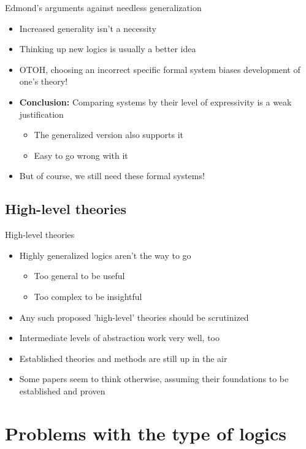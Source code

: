 \documentclass[10pt,a4paper]{beamer}
\begin{document}
\begin{frame}{Edmond's arguments against needless generalization}
\begin{itemize}
\item Increased generality isn't a necessity
\item Thinking up new logics is usually a better idea
\item OTOH, choosing an incorrect specific formal system biases development of one's theory!
\item \textbf{Conclusion:} Comparing systems by their level of expressivity is a weak justification
\begin{itemize}
\item The generalized version also supports it
\item Easy to go wrong with it
\end{itemize}
\item But of course, we still need these formal systems!
\end{itemize}
\end{frame}

\subsection{High-level theories}

\begin{frame}{High-level theories}
\begin{itemize}
\item Highly generalized  logics aren't the way to go
\begin{itemize}
\item Too general to be useful
\item Too complex to be insightful
\end{itemize}
\item Any such proposed 'high-level' theories should be scrutinized
\item Intermediate levels of abstraction work very well, too
\item Established theories and methods are still up in the air
\item Some papers seem to think otherwise, assuming their foundations to be established and proven
\end{itemize}
\end{frame}

\section{Problems with the type of logics}
\end{document}
